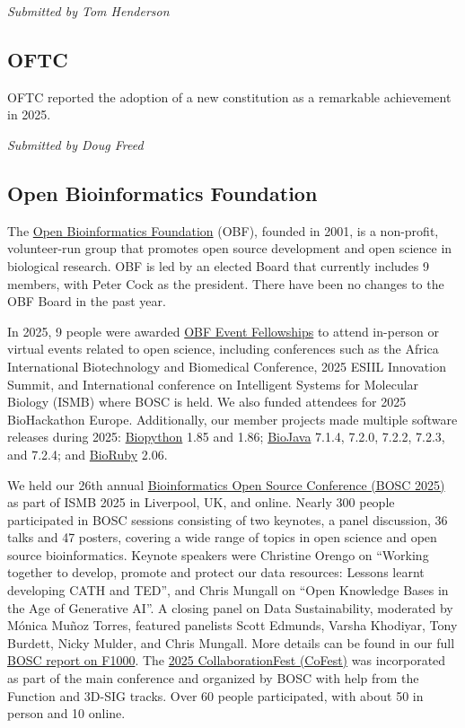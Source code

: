 \documentclass[a4paper]{report}
\begin{document}
{\em Submitted by Tom Henderson}

\subsection{OFTC}

OFTC reported the adoption of a new constitution as a remarkable achievement in 2025.

{\em Submitted by Doug Freed}

\subsection{Open Bioinformatics Foundation}

The \href{https://www.open-bio.org/}{Open Bioinformatics Foundation} (OBF), founded in 2001, is a non-profit, volunteer-run group that promotes open source development and open science in biological research. OBF is led by an elected Board that currently includes 9 members, with Peter Cock as the president. There have been no changes to the OBF Board in the past year.

In 2025, 9 people were awarded \href{https://www.open-bio.org/event-awards/}{OBF Event Fellowships} to attend in-person or virtual events related to open science, including conferences such as the Africa International Biotechnology and Biomedical Conference, 2025 ESIIL Innovation Summit, and International conference on Intelligent Systems for Molecular Biology (ISMB) where BOSC is held. We also funded attendees for 2025 BioHackathon Europe. Additionally, our member projects made multiple software releases during 2025: \href{https://biopython.org/}{Biopython} 1.85 and 1.86; \href{https://biojava.org/}{BioJava} 7.1.4, 7.2.0, 7.2.2, 7.2.3, and 7.2.4; and \href{http://bioruby.org/}{BioRuby} 2.06.

We held our 26th annual \href{https://www.open-bio.org/events/bosc-2025/}{Bioinformatics Open Source Conference (BOSC 2025)} as part of ISMB 2025 in Liverpool, UK, and online. Nearly 300 people participated in BOSC sessions consisting of two keynotes, a panel discussion, 36 talks and 47 posters, covering a wide range of topics in open science and open source bioinformatics. Keynote speakers were Christine Orengo on ``Working together to develop, promote and protect our data resources: Lessons learnt developing CATH and TED'', and Chris Mungall on ``Open Knowledge Bases in the Age of Generative AI''. A closing panel on Data Sustainability, moderated by Mónica Muñoz Torres, featured panelists Scott Edmunds, Varsha Khodiyar, Tony Burdett, Nicky Mulder, and Chris Mungall. More details can be found in our full \href{https://f1000research.com/articles/14-887/v1}{BOSC report on F1000}. The \href{https://www.open-bio.org/events/bosc-2025/ismb-collaborationfest-2025/}{2025 CollaborationFest (CoFest)} was incorporated as part of the main conference and organized by BOSC with help from the Function and 3D-SIG tracks. Over 60 people participated, with about 50 in person and 10 online.
\end{document}
